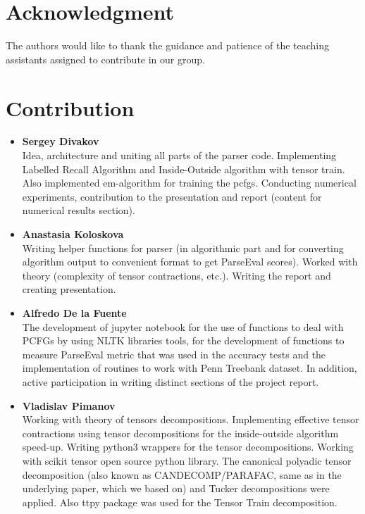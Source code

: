 \documentclass[conference]{IEEEtran}
\begin{document}
\section*{Acknowledgment}


The authors would like to thank the guidance and patience of the teaching assistants assigned to contribute in our group.


\section*{Contribution}

\begin{itemize}
    \item[] \textbf{Sergey Divakov} \\
    Idea, architecture and uniting all parts of the parser code. Implementing Labelled Recall Algorithm and Inside-Outside algorithm with tensor train. Also implemented em-algorithm for training the pcfgs. Conducting numerical experiments, contribution to the presentation and report (content for numerical results section).
    
    \item[] \textbf{Anastasia Koloskova} \\
    Writing helper functions for parser (in algorithmic part and for converting algorithm output to convenient format to get ParseEval scores). Worked with theory (complexity of tensor contractions, etc.). Writing the report and creating presentation. 
    
    \item[] \textbf{Alfredo De la Fuente} \\
    The development of jupyter notebook for the use of functions to deal with PCFGs by using NLTK libraries tools, for the development of functions to measure ParseEval metric that was used in the accuracy tests and the implementation of routines to work with Penn Treebank dataset. In addition, active participation in writing distinct sections of the project report.
    
    \item[] \textbf{Vladislav Pimanov}\\
    Working with theory of tensors decompositions. Implementing effective tensor contractions using tensor decompositions for the inside-outside algorithm speed-up.
    Writing python3 wrappers for the tensor decompositions. Working with scikit tensor open source python library. The canonical polyadic tensor decomposition (also known as CANDECOMP/PARAFAC, same as in the underlying paper, which we based on) and Tucker decompositions were applied. 
    Also ttpy package was used for the Tensor Train decomposition.
\end{itemize}
\end{document}
